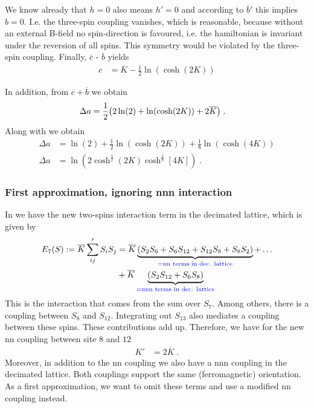We know already that $h=0$ also means $h'=0$ and according to $\overline b'$ this implies    $b=0$. 
I.e. the three-spin coupling  vanishes, which is reasonable, because without an external B-field no spin-direction  is favoured, i.e. the hamiltonian is invariant under the reversion of all spins. This symmetry would be violated by the three-spin coupling.
Finally, $\overline c$ - $\overline b$ yields
%
\begin{align}\label{eq:four:spin:term}
c &= \overline K  - \frac{1}{2}\ln(\cosh(2 K))
\end{align}
%



In addition, from $\overline c + \overline b$ we obtain
%
\begin{align*}
\Delta a &= \frac{1}{2}\qty( 2\ln(2) +  \ln(\cosh(2K)) +    2 \overline K )\;.
\end{align*}
%
Along with  we obtain
%
\begin{align}\label{eq:Delta:a}
\Delta a &=   \ln(2) + \frac{1}{2}\ln(\cosh(2K))  + \frac{1}{8}\ln(\cosh(4 K)) \\
\Delta a &=   \ln(2 \cosh^{\frac{1}{2}}(2K)\cosh^{\frac{1}{8}}[4 K]) \;.
\end{align}
%


\subsubsection{First approximation, ignoring nnn interaction}
 
 
In  we have the new two-spins interaction term in the decimated lattice, which is given by
%
\begin{align}\label{eq:E7}
E_{7}(S) :=
 \overline K \sum'_{ij} S_{i}S_{j} &=
 \overline K
\underbrace{
\qty(S_{2}S_{6}+S_{6}S_{12}+S_{12}S_{8}+S_{8}S_{2})
}_{\color{blue} = \text{nn terms in dec. lattice}}
+ \ldots\\
&+
\overline K
\underbrace{\qty(S_{2}S_{12}+S_{6}S_{8})}_{\color{blue} = \text{nnn terms in dec. lattice}}
\end{align}
%
This is the interaction that comes from the sum over $S_{7}$. 
Among others, there  is  a coupling between $S_{8}$ and $S_{12}$.
Integrating out $S_{13}$ also mediates a coupling between these spins. 
These contributions add up. Therefore, we 
have for the new nn coupling between site $8$ and $12$
%
\begin{align*}
K' &= 2 \overline K\;.
\end{align*}
%
Moreover, in addition to the nn coupling we also have a nnn
coupling in the decimated lattice. Both couplings 
support the same  (ferromagnetic) orientation. 
As a first approximation, we want to omit these terms and use 
a modified nn coupling instead.

